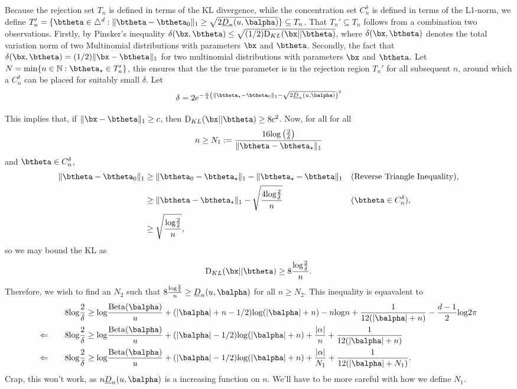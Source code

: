 \documentclass[11pt]{article}
\def\log{{\rm log}}
\newcommand{\Beta}{\mathrm{Beta}}
\newcommand{\KL}{\mathrm{D}_{KL}}
\begin{document}
Because the rejection set $T_n$ is defined in terms of the KL divergence, while the concentration set $C_n^\delta$ is defined in terms of the L1-norm, we define
$T_n' = \{\btheta \in \triangle^d : \|\btheta-\btheta_0\|_1 \geq \sqrt{2\underline{D}_n(u,\balpha)}\} \subseteq T_n$. 
That $T_n' \subseteq T_n$ follows from a combination two observations.
Firstly, by Pinsker's inequality $\delta(\bx, \btheta)\leq \sqrt{(1/2)\KL(\bx||\btheta)}$, where $\delta(\bx, \btheta)$ denotes the total variation norm of two Multinomial distributions with parameters $\bx$ and $\btheta$.
Secondly, the fact that $\delta(\bx,\btheta)=(1/2)\|\bx - \btheta\|_1 $ for two multinomial distributions with parameters $\bx$ and $\btheta$.
Let $N = \min \{n \in \mathbb{N} : \btheta_\star \in T_n'\}$, this ensures that the the true parameter is in the rejection region $T_n'$ for all subsequent $n$, around which a $C_n^\delta$ can be placed for suitably small $\delta$.
Let
\begin{equation*}
  \delta = 2e^{-\frac{n}{4}\left(\|\btheta_\star - \btheta_0\|_1-\sqrt{2\underline{D}_n(u,\balpha)}\right)^2}
\end{equation*}

This implies that, if $\|\bx-\btheta\|_1 \geq c$, then $\KL(\bx||\btheta)\geq 8 c^2$. Now, for all for all
\[
  n
  \geq
  N_1
  :=
  \frac{16\log\left(\frac{2}{\delta}\right)}
  {\|\btheta - \btheta_\star \|_1}
\]
and $\btheta \in C_n^\delta$, 
\begin{align*}
  \|\btheta-\btheta_0\|_1
  &\geq
    \|\btheta_0 - \btheta_\star \|_1
    -\|\btheta_\star - \btheta\|_1
    &&\text{(Reverse Triangle Inequality)},\\
  &\geq
    \|\btheta - \btheta_\star \|_1
    -
    \sqrt{\frac{4\log \frac{2}{\delta}}{n}}
    && (\btheta \in C_n^\delta),\\
  &\geq
    \sqrt{\frac{\log \frac{2}{\delta}}{n}},
\end{align*}
so we may bound the KL as
\[
  \KL(\bx||\btheta)\geq 8\frac{\log \frac{2}{\delta}}{n}.
\]
Therefore, we wish to find an $N_2$ such that $8\frac{\log \frac{2}{\delta}}{n}
\geq \underline{D}_n(u,\balpha)$ for all $n \geq N_2$. This inequality is equavalent to
\begin{align*}  
  &&
    8\log \frac{2}{\delta}
  &\geq
    \log \frac{\Beta(\balpha)}{u} +(|\balpha|+n-1/2)\log(|\balpha|+n)-n\log n + \frac{1}{12(|\balpha|+n)} - \frac{d-1}{2}\log 2\pi\\
  \Leftarrow\quad &&
   8\log \frac{2}{\delta}
  &\geq
    \log \frac{\Beta(\balpha)}{u} +
    (|\balpha|-1/2)\log(|\balpha|+n) + \frac{|\alpha|}{n}
    +\frac{1}{12(|\balpha|+n)}\\
  \Leftarrow\quad &&
   8\log \frac{2}{\delta}
  &\geq
    \log \frac{\Beta(\balpha)}{u} +
    (|\balpha|-1/2)\log(|\balpha|+ n) + \frac{|\alpha|}{N_1}
    +\frac{1}{12(|\balpha|+N_1)}.
\end{align*}
Crap, this won't work, as $n \underline{D}_n(u,\balpha)$ is a increasing function on $n$. We'll have to be more careful with how we define $N_1$. 
\end{document}
